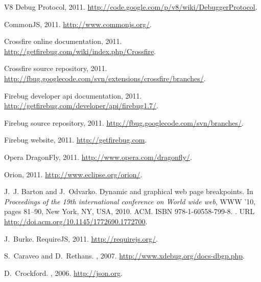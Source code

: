 \documentclass[10pt]{sigplanconf}
\begin{document}
\begin{thebibliography}{27}
V8 {D}ebug {P}rotocol, 2011.
\newblock \url{http://code.google.com/p/v8/wiki/DebuggerProtocol}.

Common{JS}, 2011.
\newblock \url{http://www.commonjs.org/}.

Crossfire online documentation, 2011{}.
\newblock \url{http://getfirebug.com/wiki/index.php/Crossfire}.

Crossfire source repository, 2011{}.
\newblock \protect\url{http://fbug.googlecode.com/svn/extensions/crossfire/branches/}.

Firebug developer api documentation, 2011{}.
\newblock \url{http://getfirebug.com/developer/api/firebug1.7/}.

Firebug source repository, 2011{}.
\newblock \url{http://fbug.googlecode.com/svn/branches/}.

Firebug website, 2011.
\newblock \url{http://getfirebug.com}.

Opera {D}ragon{F}ly, 2011.
\newblock \url{http://www.opera.com/dragonfly/}.

\vfill\eject

Orion, 2011.
\newblock \url{http://www.eclipse.org/orion/}.

J.~J. Barton and J.~Odvarko.
\newblock Dynamic and graphical web page breakpoints.
\newblock In \emph{Proceedings of the 19th international conference on World
  wide web}, WWW '10, pages 81--90, New York, NY, USA, 2010. ACM.
\newblock ISBN 978-1-60558-799-8.
\newblock {}.
\newblock URL \url{http://doi.acm.org/10.1145/1772690.1772700}.

J.~Burke.
\newblock Require{JS}, 2011.
\newblock \url{http://requirejs.org/}.

S.~Caraveo and D.~Rethans.
, 2007.
\newblock \url{http://www.xdebug.org/docs-dbgp.php}.

D.~Crockford.
, 2006.
\newblock \url{http://json.org}.


\end{thebibliography}
\end{document}
